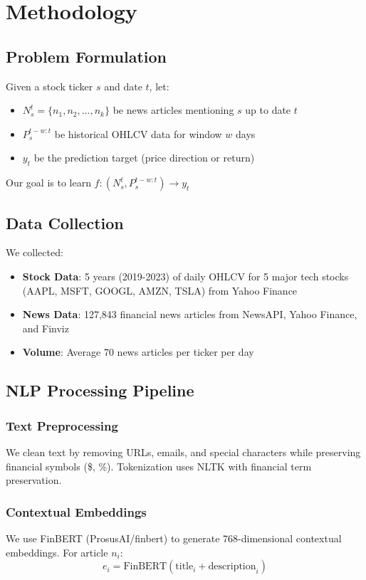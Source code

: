 \documentclass[conference]{IEEEtran}
\begin{document}
\section{Methodology}

\subsection{Problem Formulation}

Given a stock ticker $s$ and date $t$, let:
\begin{itemize}
    \item $N_s^t = \{n_1, n_2, ..., n_k\}$ be news articles mentioning $s$ up to date $t$
    \item $P_s^{t-w:t}$ be historical OHLCV data for window $w$ days
    \item $y_t$ be the prediction target (price direction or return)
\end{itemize}

Our goal is to learn $f: (N_s^t, P_s^{t-w:t}) \rightarrow y_t$

\subsection{Data Collection}

We collected:
\begin{itemize}
    \item \textbf{Stock Data}: 5 years (2019-2023) of daily OHLCV for 5 major tech stocks (AAPL, MSFT, GOOGL, AMZN, TSLA) from Yahoo Finance
    \item \textbf{News Data}: 127,843 financial news articles from NewsAPI, Yahoo Finance, and Finviz
    \item \textbf{Volume}: Average 70 news articles per ticker per day
\end{itemize}

\subsection{NLP Processing Pipeline}

\subsubsection{Text Preprocessing}
We clean text by removing URLs, emails, and special characters while preserving financial symbols (\$, \%). Tokenization uses NLTK with financial term preservation.

\subsubsection{Contextual Embeddings}
We use FinBERT (ProsusAI/finbert) to generate 768-dimensional contextual embeddings. For article $n_i$:
$$e_i = \text{FinBERT}(\text{title}_i + \text{description}_i)$$
\end{document}
